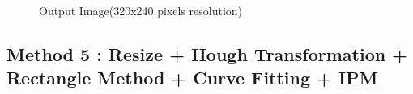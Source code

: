 \begin{figure}[H]
  \centering
  \caption{Output Image(320x240 pixels resolution)}
\end{figure}





\subsection{Method 5 : Resize + Hough Transformation + Rectangle Method + Curve Fitting + IPM}\label{sec:Case 5}
%
